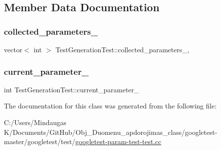 \subsection{Member Data Documentation}
\mbox{\label{class_test_generation_test_a16dfa6f4b445c7e4a7a9611b34b7a7a2}} 
\subsubsection{\texorpdfstring{collected\_parameters\_}{collected\_parameters\_}}
{\footnotesize\ttfamily vector$<$ int $>$ Test\+Generation\+Test\+::collected\+\_\+parameters\+\_\+\hspace{0.3cm}{\ttfamily [static]}, {\ttfamily [protected]}}

\mbox{\label{class_test_generation_test_a2d149b987b6dfe86ffbfae677199b0cd}} 
\subsubsection{\texorpdfstring{current\_parameter\_}{current\_parameter\_}}
{\footnotesize\ttfamily int Test\+Generation\+Test\+::current\+\_\+parameter\+\_\+\hspace{0.3cm}{\ttfamily [protected]}}



The documentation for this class was generated from the following file\+:\begin{DoxyCompactItemize}
\item 
C\+:/\+Users/\+Mindaugas K/\+Documents/\+Git\+Hub/\+Obj\+\_\+\+Duomenu\+\_\+apdorojimas\+\_\+class/googletest-\/master/googletest/test/\mbox{\hyperlink{googletest-master_2googletest_2test_2googletest-param-test-test_8cc}{googletest-\/param-\/test-\/test.\+cc}}\end{DoxyCompactItemize}

